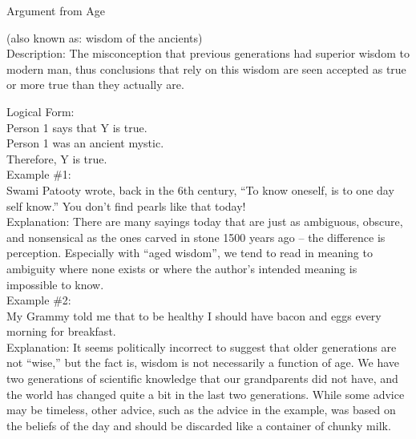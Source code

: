 \documentclass[a4paper,12pt,single,pdftex]{scrartcl}
\begin{document}
  

Argument from Age
    
      (also known as: wisdom of the ancients)
    \\

  
    Description: The misconception that previous generations had superior wisdom to modern man, thus conclusions that rely on this wisdom are seen accepted as true or more true than they actually are.

    
      Logical Form:
    \\

    
      Person 1 says that Y is true. 
    \\

    
      Person 1 was an ancient mystic.
    \\

    
      Therefore, Y is true.
    \\

    
      Example \#1:
    \\

    
      Swami Patooty wrote, back in the 6th century, “To know oneself, is to one day self know.”  You don’t find pearls like that today!
    \\

    
      Explanation: There are many sayings today that are just as ambiguous, obscure, and nonsensical as the ones carved in stone 1500 years ago -- the difference is perception.  Especially with “aged wisdom”, we tend to read in meaning to ambiguity where none exists or where the author’s intended meaning is impossible to know.
    \\

    
      Example \#2:
    \\

    
      My Grammy told me that to be healthy I should have bacon and eggs every morning for breakfast.
    \\

    
      Explanation: It seems politically incorrect to suggest that older generations are not “wise,” but the fact is, wisdom is not necessarily a function of age.  We have two generations of scientific knowledge that our grandparents did not have, and the world has changed quite a bit in the last two generations.  While some advice may be timeless, other advice, such as the advice in the example, was based on the beliefs of the day and should be discarded like a container of chunky milk.
    \\
\end{document}
